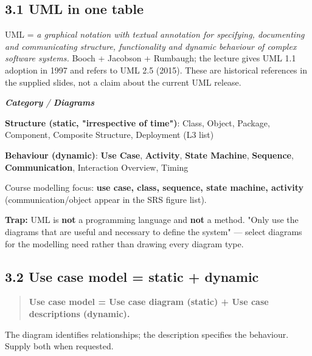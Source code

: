 \begin{studycolumns}
\vspace{0pt}



\subsection*{3.1 UML in one table}
UML = \emph{a graphical notation with textual annotation for specifying, documenting and communicating structure, functionality and dynamic behaviour of complex software systems.} Booch + Jacobson + Rumbaugh; the lecture gives UML 1.1 adoption in 1997 and refers to UML 2.5 (2015). These are historical references in the supplied slides, not a claim about the current UML release.


\begin{referenceentries}
\textit{\textbf{Category} / \textbf{Diagrams}}\par\smallskip
\noindent \textbf{\textbf{Structure} (static, "irrespective of time")}: Class, Object, Package, Component, Composite Structure, Deployment (L3 list)\par
\noindent \textbf{\textbf{Behaviour} (dynamic)}: \textbf{Use Case}, \textbf{Activity}, \textbf{State Machine}, \textbf{Sequence}, \textbf{Communication}, Interaction Overview, Timing\par
\end{referenceentries}
Course modelling focus: \textbf{use case, class, sequence, state machine, activity} (communication/\allowbreak{}object appear in the SRS figure list).

\textbf{Trap:} UML is \textbf{not} a programming language and \textbf{not} a method. "Only use the diagrams that are useful and necessary to define the system" --- select diagrams for the modelling need rather than drawing every diagram type.

\subsection*{3.2 Use case model = static + dynamic}

\begin{quote}\small\color{navy}
\textbf{Use case model = Use case diagram (static) + Use case descriptions (dynamic).}

\end{quote}
The diagram identifies relationships; the description specifies the behaviour. Supply both when requested.
\end{studycolumns}

